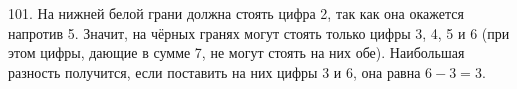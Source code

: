 101. На нижней белой грани должна стоять цифра 2, так как она окажется напротив 5. Значит, на чёрных гранях могут стоять только цифры 3, 4, 5 и 6 (при этом цифры, дающие в сумме 7, не могут стоять на них обе). Наибольшая разность получится, если поставить на них цифры 3 и 6, она равна $6-3=3.$\\
